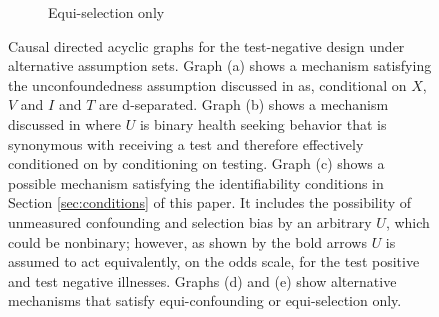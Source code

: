 \documentclass[11pt]{article}
\begin{document}
\begin{figure}[p]
\begin{subfigure}{0.49\linewidth}
        \caption{Equi-selection only\label{fig:dag_e}}
        \end{subfigure}
        \caption{Causal directed acyclic graphs for the test-negative design under alternative assumption sets. Graph (a) shows a mechanism satisfying the unconfoundedness assumption discussed in \cite{schnitzer_estimands_2022} as, conditional on $X$, $V$ and $I$ and $T$ are d-separated. Graph (b) shows a mechanism discussed in \cite{sullivan_theoretical_2016} where $U$ is binary health seeking behavior that is synonymous with receiving a test and therefore effectively conditioned on by conditioning on testing. Graph (c) shows a possible mechanism satisfying the identifiability conditions in Section \ref{sec:conditions} of this paper. It includes the possibility of unmeasured confounding and selection bias by an arbitrary $U$, which could be nonbinary; however, as shown by the bold arrows $U$ is assumed to act equivalently, on the odds scale, for the test positive and test negative illnesses. Graphs (d) and (e) show alternative mechanisms that satisfy equi-confounding or equi-selection only.}\label{fig:dags}
    \end{figure}
\end{document}
